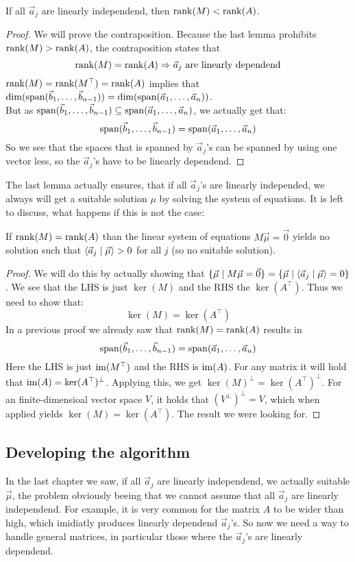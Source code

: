 \begin{lemma}
    If all $\vec a_j$ are linearly independend, then $\operatorname{rank}(M) < \operatorname{rank}(A)$.
\end{lemma}
\begin{proof}
    We will prove the contraposition. Because the last lemma prohibits $\operatorname{rank}(M) > \operatorname{rank}(A)$, the contraposition states that
    $$\operatorname{rank}(M) = \operatorname{rank}(A) \Rightarrow \vec a_j \textrm{ are linearly dependend}$$
    $\operatorname{rank}(M) = \operatorname{rank}(M^\top) = \operatorname{rank}(A)$ implies that $\dim(\operatorname{span}(\vec b_1, \dots, \vec b_{n-1})) = \dim(\operatorname{span}(\vec a_1, \dots, \vec a_n))$.\\
    But as $\operatorname{span}(\vec b_1, \dots, \vec b_{n-1}) \subseteq \operatorname{span}(\vec a_1, \dots, \vec a_n)$, we actually get that:
    $$\operatorname{span}(\vec b_1, \dots, \vec b_{n-1}) = \operatorname{span}(\vec a_1, \dots, \vec a_n)$$
    So we see that the spaces that is spanned by $\vec a_j$'s can be spanned by using one vector less, so the $\vec a_j$'s have to be linearly dependend.
\end{proof}

The last lemma actually ensures, that if all $\vec a_j$'s are linearly independed, we always will get a suitable solution $\mu$ by solving the system of equations. It is left to discuss, what happens if this is not the case:

\begin{lemma}
    If $\operatorname{rank}(M) = \operatorname{rank}(A)$ than the linear system of equations $M\vec\mu = \vec0$ yields no solution such that $\langle \vec a_j \mid \vec\mu \rangle > 0$ for all $j$ (so no suitable solution).
\end{lemma}

\begin{proof}
    We will do this by actually showing that $\{\vec\mu\mid M\vec\mu = \vec0\} = \{\vec\mu\mid \langle \vec a_j \mid \vec\mu \rangle = 0\}$. We see that the LHS is just $\ker(M)$ and the RHS the $\ker(A^\top)$. Thus we need to show that:
    $$\ker(M) = \ker(A^\top)$$
    In a previous proof we already saw that $\operatorname{rank}(M) = \operatorname{rank}(A)$ results in 
    $$\operatorname{span}(\vec b_1, \dots, \vec b_{n-1}) = \operatorname{span}(\vec a_1, \dots, \vec a_n)$$
    Here the LHS is just $\operatorname{im}(M^\top)$ and the RHS is $\operatorname{im}(A)$. For any matrix it will hold that $\operatorname{im}(A) = \ker(A^\top)^\perp$. Applying this, we get $\ker(M)^\perp = \ker(A^\top)^\perp$. For an finite-dimensioal vector space $V$, it holds that $(V^\perp)^\perp = V$, which when applied yields $\ker(M) = \ker(A^\top)$. The result we were looking for.
\end{proof}

\subsection{Developing the algorithm}
In the last chapter we saw, if all $\vec a_j$ are linearly independend, we actually suitable $\vec\mu$, the problem obviously beeing that we cannot assume that all $\vec a_j$ are linearly independend. For example, it is very common for the matrix $A$ to be wider than high, which imidiatly produces linearly dependend $\vec a_j$'s. So now we need a way to handle general matrices, in particular those where the $\vec a_j$'s are linearly dependend. 

